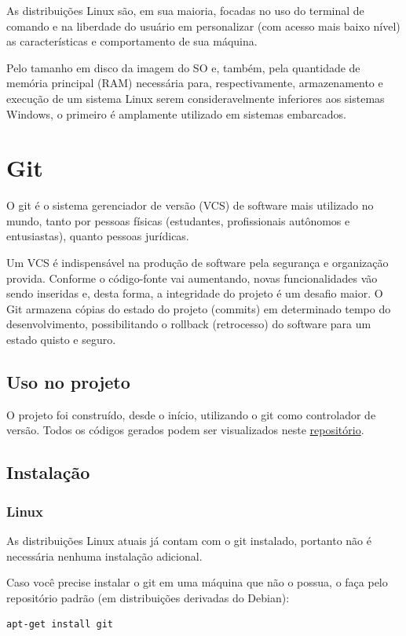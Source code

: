 \documentclass[
12pt,				%
openany,			%
twoside,			%
a4paper,			%
english,			%
french,				%
spanish,			%
brazil,				%
]{abntex2}
\begin{document}
As distribuições Linux são, em sua maioria, focadas no uso do terminal de comando e na liberdade do usuário em personalizar (com acesso mais baixo nível) as características e comportamento de sua máquina.

Pelo tamanho em disco da imagem do SO e, também, pela quantidade de memória principal (RAM) necessária para, respectivamente, armazenamento e execução de um sistema Linux serem consideravelmente inferiores aos sistemas Windows, o primeiro é amplamente utilizado em sistemas embarcados.



\section{Git}
O git é o sistema gerenciador de versão (VCS) de software mais utilizado no mundo, tanto por pessoas físicas (estudantes, profissionais autônomos e entusiastas), quanto pessoas jurídicas.

Um VCS é indispensável na produção de software pela segurança e organização provida. Conforme o código-fonte vai aumentando, novas funcionalidades vão sendo inseridas e, desta forma, a 
integridade do projeto é um desafio maior. O Git armazena cópias do estado do projeto (commits) em determinado tempo do desenvolvimento, possibilitando o rollback (retrocesso) do 
software para um estado quisto e seguro.

\subsection{Uso no projeto}
O projeto foi construído, desde o início, utilizando o git como controlador de versão. Todos os códigos gerados podem ser visualizados neste \href{https://github.com/GabrielMMelo/iot\_server}{repositório}.
\subsection{Instalação}

\subsubsection{Linux}
As distribuições Linux atuais já contam com o git instalado, portanto não é necessária nenhuma instalação adicional.

Caso você precise instalar o git em uma máquina que não o possua, o faça pelo repositório padrão (em distribuições derivadas do Debian):
        \begin{lstlisting}[style=bash]
            apt-get install git 
        \end{lstlisting}
\end{document}
